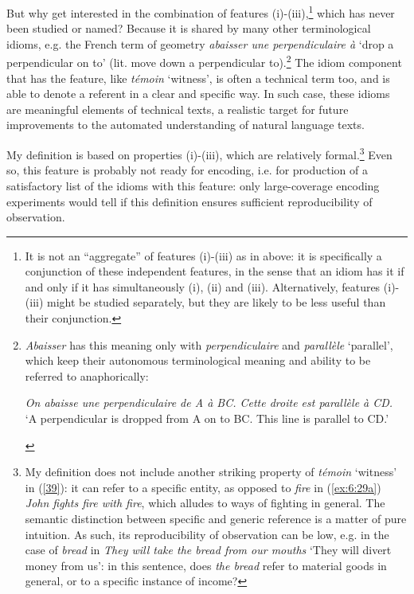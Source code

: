 \documentclass[output=paper]{langsci/langscibook}
\begin{document}
But why get interested in the combination of features (i)-(iii),\footnote{ It is not an “aggregate” of features (i)-(iii) as in  above: it is specifically a conjunction of these independent features, in the sense that an idiom has it if and only if it has simultaneously (i), (ii) and (iii). Alternatively, features (i)-(iii) might be studied separately, but they are likely to be less useful than their conjunction.} which has never been studied or named? Because it is shared by many other terminological idioms, e.g. the French term of geometry \textit{abaisser une perpendiculaire à} ‘drop a perpendicular on to’ (lit. move down a perpendicular to).\footnote{ \textit{Abaisser} has this meaning only with \textit{perpendiculaire} and \textit{parallèle} ‘parallel’, which keep their autonomous terminological meaning and ability to be referred to anaphorically: 
\begin{exe}
\ex \textit{On abaisse une perpendiculaire de A à BC. Cette droite est parallèle à CD.} \\ 
‘A perpendicular is dropped from A on to BC. This line is parallel to CD.’
\end{exe}}
The idiom component that has the feature, like\textit{ témoin} ‘witness’, is often a technical term too, and is able to denote a referent in a clear and specific way. In such case, these idioms are meaningful elements of technical texts, a realistic target for future improvements to the automated understanding of natural language texts.

My definition is based on properties (i)-(iii), which are relatively formal.\footnote{ My definition does not include another striking property of \textit{témoin} ‘witness’ in (\ref{39}): it can refer to a specific entity, as opposed to \textit{fire} in (\ref{ex:6:29a}) \textit{John fights fire with fire}, which alludes to ways of fighting in general. The semantic distinction between specific and generic reference is a matter of pure intuition. As such, its reproducibility of observation can be low, e.g. in the case of \textit{bread} in \textit{They will take the bread from our mouths} ‘They will divert money from us’: in this sentence, does \textit{the bread} refer to material goods in general, or to a specific instance of income?} Even so, this feature is probably not ready for encoding, i.e. for production of a satisfactory list of the idioms with this feature: only large-coverage encoding experiments would tell if this definition ensures sufficient reproducibility of observation.
\end{document}
